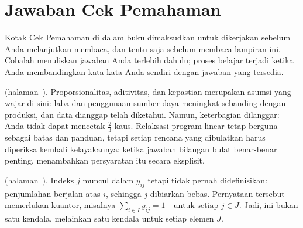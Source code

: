 
\chapter{Jawaban Cek Pemahaman}
\label{ch:checkpoint-answers}

Kotak Cek Pemahaman di dalam buku dimaksudkan untuk dikerjakan sebelum Anda
melanjutkan membaca, dan tentu saja sebelum membaca lampiran ini. Cobalah
menuliskan jawaban Anda terlebih dahulu; proses belajar terjadi ketika Anda
membandingkan kata-kata Anda sendiri dengan jawaban yang tersedia.

\bigskip

\noindent\textbf{} (halaman~\pageref{lc:lp-assumptions}).
Proporsionalitas, aditivitas, dan kepastian merupakan asumsi yang wajar di sini:
laba dan penggunaan sumber daya meningkat sebanding dengan produksi, dan data
dianggap telah diketahui. Namun, keterbagian dilanggar: Anda tidak dapat
mencetak $\tfrac23$ kaus. Relaksasi program linear tetap berguna sebagai batas
dan panduan, tetapi setiap rencana yang dibulatkan harus diperiksa kembali
kelayakannya; ketika jawaban bilangan bulat benar-benar penting,
\OOIntegerProgrammingReference{} menambahkan persyaratan itu secara eksplisit.

\medskip

\noindent\textbf{} (halaman~\pageref{lc:missing-index}).
Indeks $j$ muncul dalam $y_{ij}$ tetapi tidak pernah didefinisikan: penjumlahan
berjalan atas $i$, sehingga $j$ dibiarkan bebas. Pernyataan tersebut memerlukan
kuantor, misalnya
\(\sum_{i \in I} y_{ij}=1 \quad \text{untuk setiap } j \in J.\)
Jadi, ini bukan satu kendala, melainkan satu kendala untuk setiap elemen $J$.
